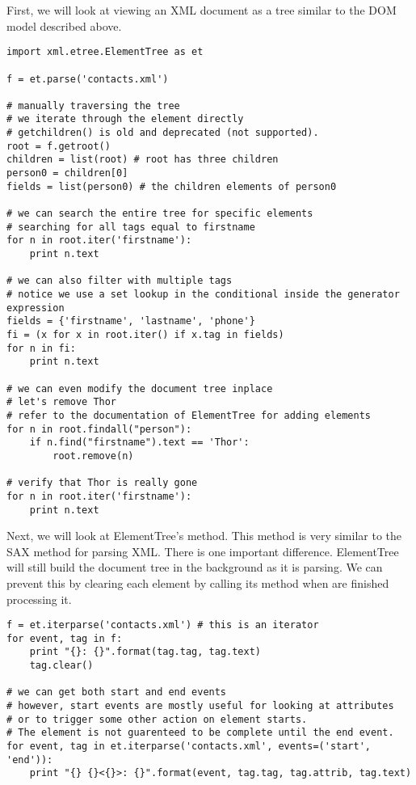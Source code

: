 First, we will look at viewing an XML document as a tree similar to the DOM model described above.
\begin{lstlisting}
import xml.etree.ElementTree as et

f = et.parse('contacts.xml')

# manually traversing the tree
# we iterate through the element directly
# getchildren() is old and deprecated (not supported).
root = f.getroot()
children = list(root) # root has three children
person0 = children[0]
fields = list(person0) # the children elements of person0

# we can search the entire tree for specific elements
# searching for all tags equal to firstname
for n in root.iter('firstname'):
    print n.text
    
# we can also filter with multiple tags 
# notice we use a set lookup in the conditional inside the generator expression
fields = {'firstname', 'lastname', 'phone'}
fi = (x for x in root.iter() if x.tag in fields)
for n in fi:
    print n.text
    
# we can even modify the document tree inplace
# let's remove Thor
# refer to the documentation of ElementTree for adding elements
for n in root.findall("person"):
    if n.find("firstname").text == 'Thor':
        root.remove(n)

# verify that Thor is really gone
for n in root.iter('firstname'):
    print n.text
\end{lstlisting}

Next, we will look at ElementTree's  method.
This method is very similar to the SAX method for parsing XML.
There is one important difference.
ElementTree will still build the document tree in the background as it is parsing.
We can prevent this by clearing each element by calling its  method when are finished processing it.
\begin{lstlisting}
f = et.iterparse('contacts.xml') # this is an iterator
for event, tag in f:
    print "{}: {}".format(tag.tag, tag.text)
    tag.clear()
    
# we can get both start and end events
# however, start events are mostly useful for looking at attributes
# or to trigger some other action on element starts.
# The element is not guarenteed to be complete until the end event.
for event, tag in et.iterparse('contacts.xml', events=('start', 'end')):
    print "{} {}<{}>: {}".format(event, tag.tag, tag.attrib, tag.text)
\end{lstlisting}




